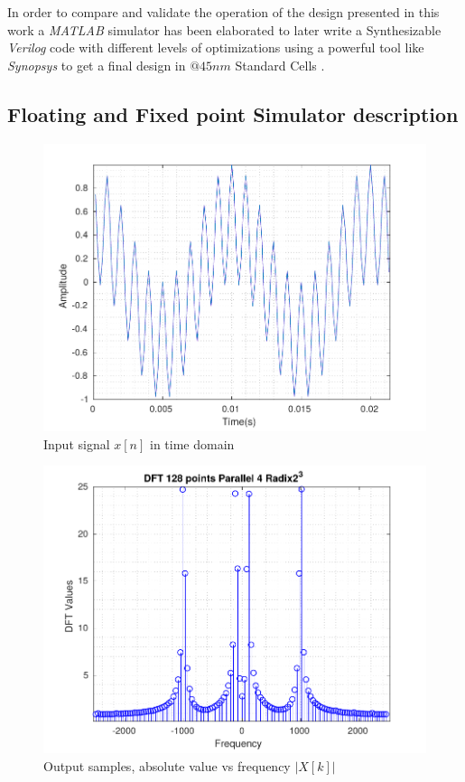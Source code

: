 \documentclass[10pt,times,mathptm,psfig,final,journal,comsoc]{IEEEtran}
\begin{document}

In order to compare and validate the operation of the design presented in this work a \textit{MATLAB} simulator has been elaborated to later write  a Synthesizable \textit{Verilog} code with different levels of optimizations using a powerful tool like \textit{Synopsys} to get a final design in $@45nm$ Standard Cells \cite{freePdk}.



\subsection{Floating and Fixed point Simulator description}

\begin{figure}%
	\centering
	\includegraphics[width=0.92\linewidth]{Diagramas/DftInputSignal.pdf}
	\caption{Input signal $x[n]$ in time domain}
	\label{fig:dftinputsignal}
\end{figure}

\begin{figure}[ht!] 
	\centering
	\includegraphics[width=0.95\linewidth]{Diagramas/DftFixedPoint.pdf}
	\caption{Output samples, absolute value vs frequency $|X[k]|$}
	\label{fig:dftfixedpoint}
\end{figure}
\end{document}
